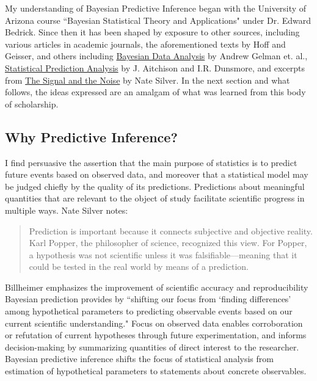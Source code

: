\documentclass[12pt, a4paper]{article}
\begin{document}
My understanding of Bayesian Predictive Inference began with the University of Arizona course ``Bayesian Statistical Theory and Applications" under Dr. Edward Bedrick.  Since then it has been shaped by exposure to other sources, including various articles in academic journals, the aforementioned texts by Hoff and Geisser, and others including \underline{Bayesian Data Analysis} by Andrew Gelman et. al., \underline{Statistical Prediction Analysis} by J. Aitchison and I.R. Dunsmore, and excerpts from \underline{The Signal and the Noise} by Nate Silver.  In the next section and what follows, the ideas expressed are an amalgam of what was learned from this body of scholarship.

  \subsection{Why Predictive Inference?}


I find persuasive the assertion that the main purpose of statistics is to predict future events based on observed data, and moreover that a statistical model may be judged chiefly by the quality of its predictions.  Predictions about meaningful quantities that are relevant to the object of study facilitate scientific progress in multiple ways.  Nate Silver notes:

\begin{quote}
Prediction is important because it connects subjective and objective reality. Karl Popper, the philosopher of science, recognized this view. For Popper, a hypothesis was not scientific unless it was falsifiable—meaning that it could be tested in the real world by means of a prediction.
\end{quote}

\noindent Billheimer emphasizes the improvement of scientific accuracy and reproducibility Bayesian prediction provides by ``shifting our focus from `finding differences' among hypothetical parameters to predicting observable events based on our current scientific understanding." Focus on observed data enables corroboration or refutation of current hypotheses through future experimentation, and informs decision-making by summarizing quantities of direct interest to the researcher.  Bayesian predictive inference shifts the focus of statistical analysis from estimation of hypothetical parameters to statements about concrete observables.\\
\end{document}
